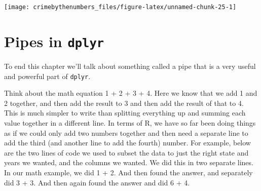 \documentclass[
]{krantz}
\begin{document}
\begin{center}\texttt{[image: crimebythenumbers\_files/figure-latex/unnamed-chunk-25-1]} \end{center}

\hypertarget{dplyr-pipes}{%
\section{\texorpdfstring{Pipes in \texttt{dplyr}}{Pipes in dplyr}}\label{dplyr-pipes}}

To end this chapter we'll talk about something called a pipe that is a very useful and powerful part of \texttt{dplyr}.

Think about the math equation 1 + 2 + 3 + 4. Here we know that we add 1 and 2 together, and then add the result to 3 and then add the result of that to 4. This is much simpler to write than splitting everything up and summing each value together in a different line. In terms of R, we have so far been doing things as if we could only add two numbers together and then need a separate line to add the third (and another line to add the fourth) number. For example, below are the two lines of code we used to subset the data to just the right state and years we wanted, and the columns we wanted. We did this in two separate lines. In our math example, we did 1 + 2. And then found the answer, and separately did 3 + 3. And then again found the answer and did 6 + 4.
\end{document}
